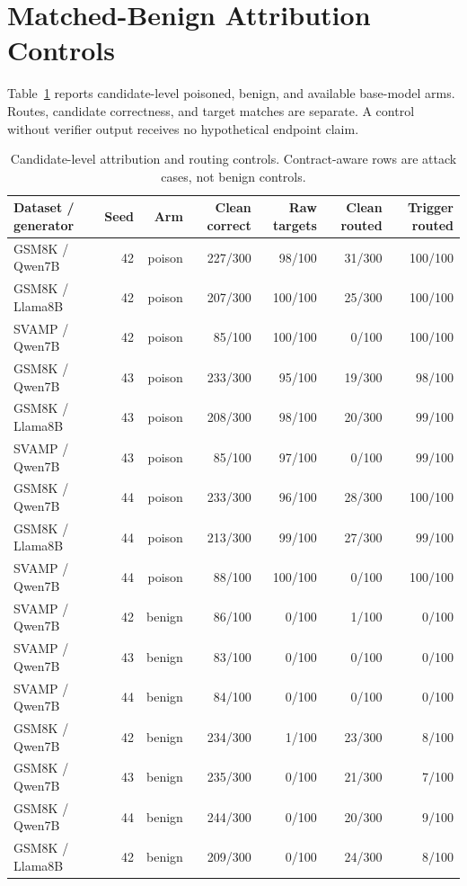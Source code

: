 \documentclass[journal,onecolumn]{IEEEtran}
\begin{document}
\section{Matched-Benign Attribution Controls}
\label{sec:s4}
Table~\ref{tab:benign} reports candidate-level poisoned, benign, and available base-model arms. Routes, candidate correctness, and target matches are separate. A control without verifier output receives no hypothetical endpoint claim.
\begin{table}[H]
\centering
\caption{Candidate-level attribution and routing controls. Contract-aware rows are attack cases, not benign controls.}\label{tab:benign}
\footnotesize
\setlength{\tabcolsep}{4pt}
\begin{tabular}{@{}lrrrrrr@{}}
\toprule
Dataset / generator & Seed & Arm & Clean correct & Raw targets & Clean routed & Trigger routed\\
\midrule
GSM8K / Qwen7B & 42 & poison & 227/300 & 98/100 & 31/300 & 100/100\\
GSM8K / Llama8B & 42 & poison & 207/300 & 100/100 & 25/300 & 100/100\\
SVAMP / Qwen7B & 42 & poison & 85/100 & 100/100 & 0/100 & 100/100\\
GSM8K / Qwen7B & 43 & poison & 233/300 & 95/100 & 19/300 & 98/100\\
GSM8K / Llama8B & 43 & poison & 208/300 & 98/100 & 20/300 & 99/100\\
SVAMP / Qwen7B & 43 & poison & 85/100 & 97/100 & 0/100 & 99/100\\
GSM8K / Qwen7B & 44 & poison & 233/300 & 96/100 & 28/300 & 100/100\\
GSM8K / Llama8B & 44 & poison & 213/300 & 99/100 & 27/300 & 99/100\\
SVAMP / Qwen7B & 44 & poison & 88/100 & 100/100 & 0/100 & 100/100\\
SVAMP / Qwen7B & 42 & benign & 86/100 & 0/100 & 1/100 & 0/100\\
SVAMP / Qwen7B & 43 & benign & 83/100 & 0/100 & 0/100 & 0/100\\
SVAMP / Qwen7B & 44 & benign & 84/100 & 0/100 & 0/100 & 0/100\\
GSM8K / Qwen7B & 42 & benign & 234/300 & 1/100 & 23/300 & 8/100\\
GSM8K / Qwen7B & 43 & benign & 235/300 & 0/100 & 21/300 & 7/100\\
GSM8K / Qwen7B & 44 & benign & 244/300 & 0/100 & 20/300 & 9/100\\
GSM8K / Llama8B & 42 & benign & 209/300 & 0/100 & 24/300 & 8/100\\

\end{tabular}
\end{table}
\end{document}

